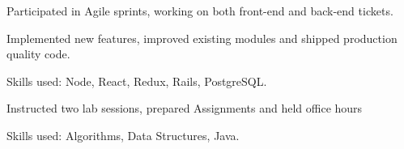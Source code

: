     \begin{tightemize}
      \item Participated in Agile sprints, working on both front-end and back-end tickets.
      \item Implemented new features, improved existing modules and shipped production quality code.
      \item Skills used: Node, React, Redux, Rails, PostgreSQL.
    \end{tightemize}
    \sectionsep

    \begin{tightemize}
      \item Instructed two lab sessions, prepared Assignments and held office hours
      \item Skills used: Algorithms, Data Structures, Java.
    \end{tightemize}
    \sectionsep
